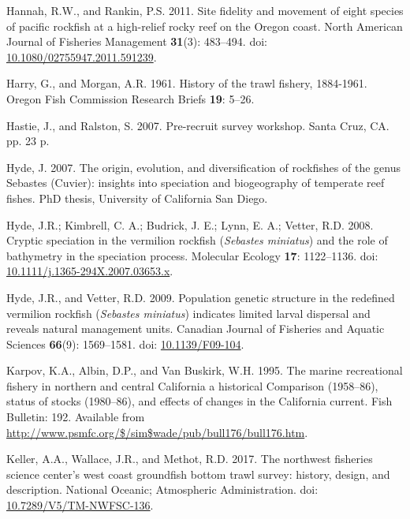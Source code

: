 \documentclass[
  english,
  a4paper,
]{article}
\newlength{\cslhangindent}
\newlength{\cslentryspacingunit} %
\newenvironment{CSLReferences}[2] %
 {%
  \setlength{\parindent}{0pt}
  \ifodd #1
  \let\oldpar\par
  \def\par{\hangindent=\cslhangindent\oldpar}
  \fi
  \setlength{\parskip}{#2\cslentryspacingunit}
 }%
 {}
\begin{document}
\begin{CSLReferences}{1}{0}
\leavevmode{}%
Hannah, R.W., and Rankin, P.S. 2011. {Site fidelity and movement of eight species of pacific rockfish at a high-relief rocky reef on the Oregon coast}. North American Journal of Fisheries Management \textbf{31}(3): 483--494. doi: \href{https://doi.org/10.1080/02755947.2011.591239}{10.1080/02755947.2011.591239}.

\leavevmode{}%
Harry, G., and Morgan, A.R. 1961. {History of the trawl fishery, 1884-1961}. Oregon Fish Commission Research Briefs \textbf{19}: 5--26.

\leavevmode{}%
Hastie, J., and Ralston, S. 2007. {Pre-recruit survey workshop}. Santa Cruz, CA. pp. 23 p.

\leavevmode{}%
Hyde, J. 2007. {The origin, evolution, and diversification of rockfishes of the genus Sebastes (Cuvier): insights into speciation and biogeography of temperate reef fishes}. PhD thesis, University of California San Diego.

\leavevmode{}%
Hyde, J.R.; Kimbrell, C. A.; Budrick, J. E.; Lynn, E. A.; Vetter, R.D. 2008. {Cryptic speciation in the vermilion rockfish (\emph{Sebastes miniatus}) and the role of bathymetry in the speciation process}. Molecular Ecology \textbf{17}: 1122--1136. doi: \href{https://doi.org/10.1111/j.1365-294X.2007.03653.x}{10.1111/j.1365-294X.2007.03653.x}.

\leavevmode{}%
Hyde, J.R., and Vetter, R.D. 2009. {Population genetic structure in the redefined vermilion rockfish (\emph{Sebastes miniatus}) indicates limited larval dispersal and reveals natural management units}. Canadian Journal of Fisheries and Aquatic Sciences \textbf{66}(9): 1569--1581. doi: \href{https://doi.org/10.1139/F09-104}{10.1139/F09-104}.

\leavevmode{}%
Karpov, K.A., Albin, D.P., and Van Buskirk, W.H. 1995. {The marine recreational fishery in northern and central California a historical Comparison (1958--86), status of stocks (1980--86), and effects of changes in the California current}. Fish Bulletin: 192. Available from \url{http://www.psmfc.org/$/sim$wade/pub/bull176/bull176.htm}.

\leavevmode{}%
Keller, A.A., Wallace, J.R., and Methot, R.D. 2017. {The northwest fisheries science center's west coast groundfish bottom trawl survey: history, design, and description}. National Oceanic; Atmospheric Administration. doi: \href{https://doi.org/10.7289/V5/TM-NWFSC-136}{10.7289/V5/TM-NWFSC-136}.


\end{CSLReferences}
\end{document}
